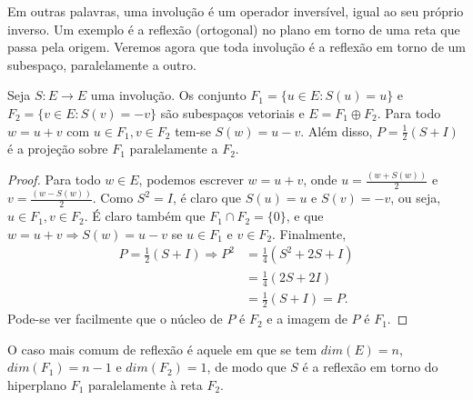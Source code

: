 Em outras palavras, uma involução é um operador inversível, igual ao seu próprio inverso. Um exemplo é a reflexão (ortogonal) no plano em torno de uma reta que passa pela origem. Veremos agora que toda involução é a reflexão em torno de um subespaço, paralelamente a outro.

\begin{teo}
  Seja $S:E\rightarrow E$ uma involução. Os conjunto $F_1=\{u\in E: S(u)=u\}$ e $F_2=\{v\in E:S(v)=-v\}$ são subespaços vetoriais e $E=F_1\oplus F_2$. Para todo $w=u+v$ com $u\in F_1, v\in F_2$ tem-se $S(w)=u-v$. Além disso, $P=\frac{1}{2}(S+I)$ é a projeção sobre $F_1$ paralelamente a $F_2$.
\end{teo}

\begin{proof}
Para todo $w\in E$, podemos escrever $w=u+v$, onde $u=\frac{(w+S(w))}{2}$ e $v=\frac{(w-S(w))}{2}$. Como $S^2=I$, é claro que $S(u)=u$ e $S(v)=-v$, ou seja, $u\in F_1, v\in F_2$. É claro também que $F_1\cap F_2=\{0\}$, e que $w=u+v \Rightarrow S(w)=u-v$ se $u\in F_1$ e $v\in F_2$. Finalmente, 
\begin{align*}
   P=\frac{1}{2}(S+I)\Rightarrow P^2 &= \frac{1}{4}(S^2+2S+I)\\
   &= \frac{1}{4}(2S+2I)\\
   &= \frac{1}{2}(S+I)=P.
\end{align*}
Pode-se ver facilmente que o núcleo de $P$ é $F_2$ e a imagem de $P$ é $F_1$.
\end{proof}

O caso mais comum de reflexão é aquele em que se tem $dim(E)=n$, $dim(F_1)=n-1$ e $dim(F_2)=1$, de modo que $S$ é a reflexão em torno do hiperplano $F_1$ paralelamente à reta $F_2$.
